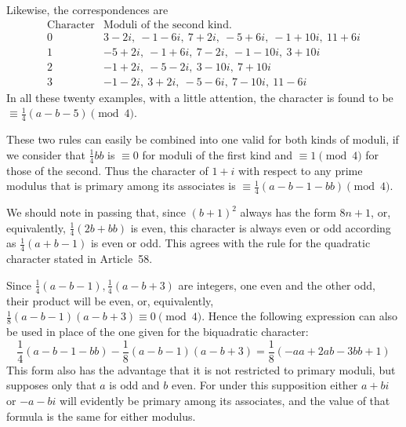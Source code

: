 Likewise, the correspondences are
\[
\begin{array}{c|l}
\text{Character}&\text{Moduli of the second kind.}\\\hline
0&3-2i,\ -1-6i,\ 7+2i,\ -5+6i,\ -1+10i,\ 11+6i\\
1&-5+2i,\ -1+6i,\ 7-2i,\ -1-10i,\ 3+10i\\
2&-1+2i,\ -5-2i,\ 3-10i,\ 7+10i\\
3&-1-2i,\ 3+2i,\ -5-6i,\ 7-10i,\ 11-6i
\end{array}
\]
In all these twenty examples, with a little attention, the character is found to be $\equiv\frac14(a-b-5)\pmod4$.

These two rules can easily be combined into one valid for both kinds of moduli, if we consider that $\frac14bb$ is $\equiv0$ for moduli of the first kind and $\equiv1\pmod4$ for those of the second. Thus the character of $1+i$ with respect to any prime modulus that is primary among its associates is $\equiv\frac14(a-b-1-bb)\pmod4$.

We should note in passing that, since $(b+1)^2$ always has the form $8n+1$, or, equivalently, $\frac14(2b+bb)$ is even, this character is always even or odd according as $\frac14(a+b-1)$ is even or odd. This agrees with the rule for the quadratic character stated in Article~58.

Since $\frac14(a-b-1),\frac14(a-b+3)$ are integers, one even and the other odd, their product will be even, or, equivalently, $\frac18(a-b-1)(a-b+3)\equiv0\pmod4$. Hence the following expression can also be used in place of the one given for the biquadratic character:
\[
\frac14(a-b-1-bb)-\frac18(a-b-1)(a-b+3)=\frac18(-aa+2ab-3bb+1)
\]
This form also has the advantage that it is not restricted to primary moduli, but supposes only that $a$ is odd and $b$ even. For under this supposition either $a+bi$ or $-a-bi$ will evidently be primary among its associates, and the value of that formula is the same for either modulus.
